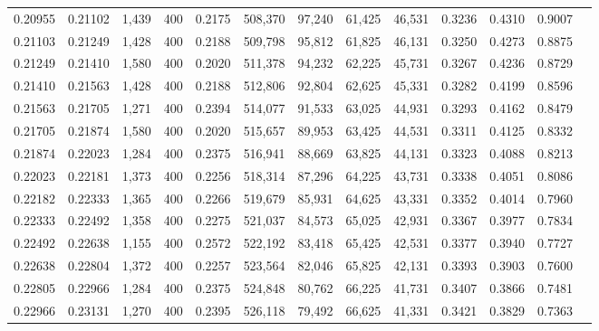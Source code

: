 \begin{tabular}{rrrrrrrrrrrrr}
0.20955 & 0.21102 &  1,439 & 400 &                                     0.2175 & 508,370 &  97,240 &  61,425 &  46,531 & 0.3236 & 0.4310 & 0.9007 \\
0.21103 & 0.21249 &  1,428 & 400 &                                     0.2188 & 509,798 &  95,812 &  61,825 &  46,131 & 0.3250 & 0.4273 & 0.8875 \\
0.21249 & 0.21410 &  1,580 & 400 &                                     0.2020 & 511,378 &  94,232 &  62,225 &  45,731 & 0.3267 & 0.4236 & 0.8729 \\
0.21410 & 0.21563 &  1,428 & 400 &                                     0.2188 & 512,806 &  92,804 &  62,625 &  45,331 & 0.3282 & 0.4199 & 0.8596 \\
0.21563 & 0.21705 &  1,271 & 400 &                                     0.2394 & 514,077 &  91,533 &  63,025 &  44,931 & 0.3293 & 0.4162 & 0.8479 \\
0.21705 & 0.21874 &  1,580 & 400 &                                     0.2020 & 515,657 &  89,953 &  63,425 &  44,531 & 0.3311 & 0.4125 & 0.8332 \\
0.21874 & 0.22023 &  1,284 & 400 &                                     0.2375 & 516,941 &  88,669 &  63,825 &  44,131 & 0.3323 & 0.4088 & 0.8213 \\
0.22023 & 0.22181 &  1,373 & 400 &                                     0.2256 & 518,314 &  87,296 &  64,225 &  43,731 & 0.3338 & 0.4051 & 0.8086 \\
0.22182 & 0.22333 &  1,365 & 400 &                                     0.2266 & 519,679 &  85,931 &  64,625 &  43,331 & 0.3352 & 0.4014 & 0.7960 \\
0.22333 & 0.22492 &  1,358 & 400 &                                     0.2275 & 521,037 &  84,573 &  65,025 &  42,931 & 0.3367 & 0.3977 & 0.7834 \\
0.22492 & 0.22638 &  1,155 & 400 &                                     0.2572 & 522,192 &  83,418 &  65,425 &  42,531 & 0.3377 & 0.3940 & 0.7727 \\
0.22638 & 0.22804 &  1,372 & 400 &                                     0.2257 & 523,564 &  82,046 &  65,825 &  42,131 & 0.3393 & 0.3903 & 0.7600 \\
0.22805 & 0.22966 &  1,284 & 400 &                                     0.2375 & 524,848 &  80,762 &  66,225 &  41,731 & 0.3407 & 0.3866 & 0.7481 \\
0.22966 & 0.23131 &  1,270 & 400 &                                     0.2395 & 526,118 &  79,492 &  66,625 &  41,331 & 0.3421 & 0.3829 & 0.7363 \\

\end{tabular}

